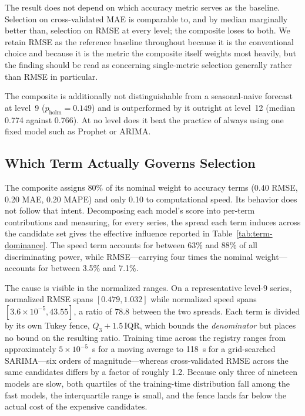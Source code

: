 The result does not depend on which accuracy metric serves as the baseline. Selection on cross-validated MAE is comparable to, and by median marginally better than, selection on RMSE at every level; the composite loses to both. We retain RMSE as the reference baseline throughout because it is the conventional choice and because it is the metric the composite itself weights most heavily, but the finding should be read as concerning single-metric selection generally rather than RMSE in particular.

The composite is additionally not distinguishable from a seasonal-naive forecast at level~9 ($p_{\text{holm}}=0.149$) and is outperformed by it outright at level~12 (median 0.774 against 0.766). At no level does it beat the practice of always using one fixed model such as Prophet or ARIMA.

\subsection{Which Term Actually Governs Selection}
The composite assigns 80\% of its nominal weight to accuracy terms (0.40 RMSE, 0.20 MAE, 0.20 MAPE) and only 0.10 to computational speed. Its behavior does not follow that intent. Decomposing each model's score into per-term contributions and measuring, for every series, the spread each term induces across the candidate set gives the effective influence reported in Table~\ref{tab:term-dominance}. The speed term accounts for between 63\% and 88\% of all discriminating power, while RMSE---carrying four times the nominal weight---accounts for between 3.5\% and 7.1\%.



The cause is visible in the normalized ranges. On a representative level-9 series, normalized RMSE spans $[0.479, 1.032]$ while normalized speed spans $[3.6\times10^{-5}, 43.55]$, a ratio of 78.8 between the two spreads. Each term is divided by its own Tukey fence, $Q_3 + 1.5\,\mathrm{IQR}$, which bounds the \emph{denominator} but places no bound on the resulting ratio. Training time across the registry ranges from approximately $5\times10^{-5}$~s for a moving average to 118~s for a grid-searched SARIMA---six orders of magnitude---whereas cross-validated RMSE across the same candidates differs by a factor of roughly 1.2. Because only three of nineteen models are slow, both quartiles of the training-time distribution fall among the fast models, the interquartile range is small, and the fence lands far below the actual cost of the expensive candidates.


